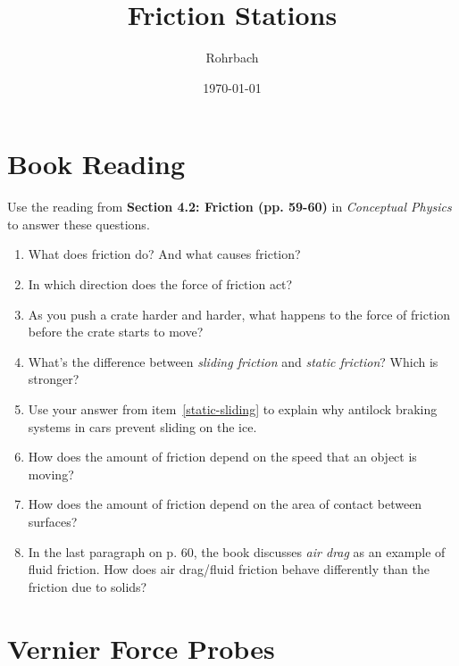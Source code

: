 \documentclass[10pt]{exam}
\title{Friction Stations}
\author{Rohrbach}
\date{\today}
\begin{document}
\maketitle


\section{Book Reading} \label{book}

Use the reading from {\bf Section 4.2: Friction (pp. 59-60)} in \emph{Conceptual Physics} to answer these questions.

\begin{enumerate}
  \item 
    What does friction do?  And what causes friction?
    \vs

  \item 
    In which direction does the force of friction act?
    \vs

  \item 
    As you push a crate harder and harder, what happens to the force of friction before the crate starts to move?
    \vs

  \item
    What's the difference between \emph{sliding friction} and \emph{static friction}?  Which is stronger? \label{static-sliding}
    \vs

\pagebreak

  \item
    Use your answer from item~\ref{static-sliding} to explain why antilock braking systems in cars prevent sliding on the ice.
    \vs

  \item
    How does the amount of friction depend on the speed that an object is moving?
    \vs

  \item
    How does the amount of friction depend on the area of contact between surfaces?
    \vs 

  \item 
    In the last paragraph on p. 60, the book discusses \emph{air drag} as an example of fluid friction.  How does air drag/fluid friction behave differently than the friction due to solids?
    \vs 
  
\end{enumerate}


\pagebreak
\section{Vernier Force Probes} \label{vernier}
\end{document}
